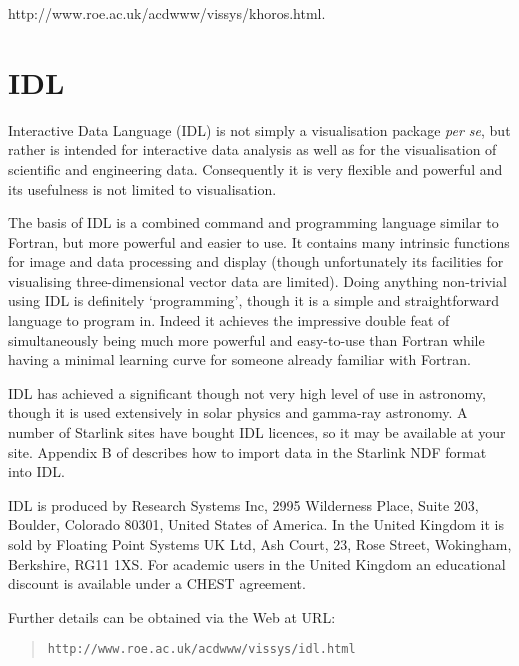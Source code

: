 \begin{htmlonly}
{http://www.roe.ac.uk/acdwww/vissys/khoros.html}.
\end{htmlonly}


\section{IDL \label{IDL}  }

Interactive Data Language (IDL) is not simply a visualisation package
{\it per se}, but rather is intended for interactive data analysis as 
well as for the visualisation of scientific and engineering data. 
Consequently it is very flexible and powerful and its usefulness is not
limited to visualisation.

The basis of IDL is a combined command and programming language similar
to Fortran, but more powerful and easier to use. It contains many
intrinsic functions for image and data processing and display (though 
unfortunately its facilities for visualising three-dimensional vector 
data are limited). Doing anything non-trivial using IDL is definitely 
`programming', though it is a simple and straightforward language to 
program in. Indeed it achieves the impressive double feat of
simultaneously being much more powerful and easy-to-use than Fortran 
while having a minimal learning curve for someone already familiar with 
Fortran.

IDL has achieved a significant though not very high level of use in
astronomy, though it is used extensively in solar physics and gamma-ray
astronomy. A number of Starlink sites have bought IDL licences, so it
may be available at your site.  Appendix B of 
\cite{SUN55} describes how to import data in the
Starlink NDF format into IDL.

IDL is produced by Research Systems Inc, 2995 Wilderness Place, Suite
203, Boulder, Colorado 80301, United States of America.  In the United
Kingdom it is sold by Floating Point Systems UK Ltd, Ash Court, 23, Rose
Street, Wokingham, Berkshire, RG11 1XS. For academic users in the
United Kingdom an educational discount is available under a CHEST
agreement.

\begin{latexonly}
Further details can be obtained via the Web at URL:

\begin{quote}
{\tt http://www.roe.ac.uk/acdwww/vissys/idl.html}
\end{quote}
\end{latexonly}

